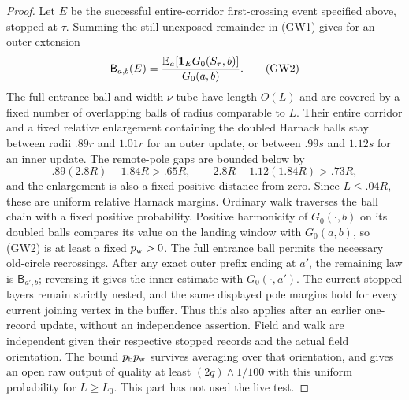 \begin{proof}
Let \(E\) be the successful entire-corridor first-crossing event specified
above, stopped at \(\tau\).  Summing the still unexposed remainder in
(GW1) gives for an outer extension
\[
 \mathsf B_{a,b}(E)
       ={\mathbb E_a[\mathbf1_EG_0(S_\tau,b)]\over G_0(a,b)}.       \tag{GW2}
\]
The full entrance ball and width-\(\nu\) tube have length \(O(L)\) and
are covered by a fixed number of overlapping balls of radius comparable
to \(L\).  Their entire corridor and a fixed relative enlargement containing
the doubled Harnack balls stay between radii \(.89r\) and \(1.01r\) for
an outer update, or between \(.99s\) and \(1.12s\) for an inner update.
The remote-pole gaps are bounded below by
\[
 .89(2.8R)-1.84R>.65R,\qquad
 2.8R-1.12(1.84R)>.73R,
\]
and the enlargement is also a fixed positive distance from zero.  Since
\(L\le.04R\), these are uniform relative Harnack margins.  Ordinary
walk traverses the ball chain with a fixed positive probability.  Positive
harmonicity of \(G_0(\cdot,b)\) on its doubled balls compares its value
on the landing window with \(G_0(a,b)\), so (GW2) is at least a fixed
\(p_{\rm w}>0\).  The full entrance ball permits the necessary old-circle
recrossings.  After any exact outer prefix ending at \(a'\), the remaining
law is \(\mathsf B_{a',b}\); reversing it gives the inner estimate with
\(G_0(\cdot,a')\).  The current stopped layers remain strictly nested,
and the same displayed pole margins hold for every current joining vertex
in the buffer.  Thus this also applies after an earlier one-record update,
without an independence assertion.  Field and walk are independent given
their respective stopped records and the actual field orientation.  The
bound \(p_{\rm b}p_{\rm w}\) survives averaging over that orientation,
and gives an open raw output of quality at least
\((2q)\wedge1/100\) with this uniform probability for \(L\ge L_0\).
This part has not used the live test.


\end{proof}
